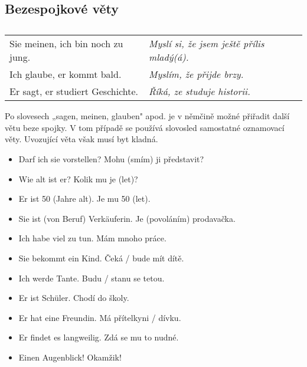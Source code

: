     \subsection*{Bezespojkové věty}
      \begin{table}[ht!]   %
        \centering
        \begin{tabular}{ll} 
          Sie meinen, ich bin noch zu jung. & \emph{Myslí si, že jsem ještě přílis mladý(á).} \\
          Ich glaube, er kommt bald.        & \emph{Myslím, že přijde brzy.}  \\
          Er sagt, er studiert Geschichte.  & \emph{Říká, ze studuje historii.}  \\
        \end{tabular}
        \caption*{ }
       \end{table} 
       Po slovesech „sagen, meinen, glauben" apod. je v němčině možné přiřadit další větu beze 
       spojky. V tom případě se používá slovosled samostatné oznamovací věty. Uvozující věta však 
       musí byt kladná.


  \begin{itemize}[noitemsep] %
    \item Darf ich sie vorstellen?         Mohu (smím) ji představit?
    \item Wie alt ist er?                  Kolik mu je (let)?
    \item Er ist 50 (Jahre alt).           Je mu 50 (let).
    \item Sie ist (von Beruf) Verkäuferin. Je (povoláním) prodavačka.
    \item Ich habe viel zu tun.            Mám mnoho práce.
    \item Sie bekommt ein Kind.            Čeká / bude mít dítě.
    \item Ich werde Tante.                 Budu / stanu se tetou.
    \item Er ist Schüler.                  Chodí do školy.
    \item Er hat eine Freundin.            Má přítelkyni / dívku.  
    \item Er findet es langweilig.         Zdá se mu to nudné.
    \item Einen Augenblick!                Okamžik! 
  \end{itemize}